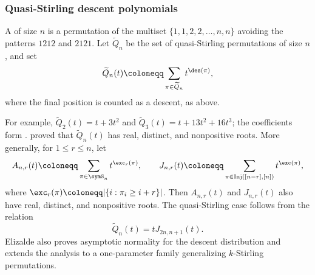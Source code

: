 \subsubsection[quasiStirlingDescentRealRooted]{Quasi-Stirling descent polynomials}

\begin{example*}
A \label{quasiStirlingPermutation}
of size $n$ is a permutation of the multiset
$\{1,1,2,2,\dotsc,n,n\}$ avoiding the patterns $1212$ and $2121$.
Let $\widetilde{Q}_n$ be the set of quasi-Stirling permutations of size $n$,
and set
\[
 \widetilde{Q}_n(t) \coloneqq \sum_{\pi \in \widetilde{Q}_n} t^{\des(\pi)},
\]
where the final position is counted as a descent, as above.

For example, $\widetilde{Q}_2(t)=t+3t^2$ and
$\widetilde{Q}_3(t)=t+13t^2+16t^3$; the coefficients form .
 \cite[Thm.~3.2]{Elizalde2021} proved that
$\widetilde{Q}_n(t)$ has real, distinct, and nonpositive roots.
More generally, for $1 \leq r \leq n$, let
\[
 A_{n,r}(t) \coloneqq \sum_{\pi \in \symS_n} t^{\exc_r(\pi)}, \qquad
 J_{n,r}(t) \coloneqq \sum_{\pi \in \operatorname{Inj}([n-r],[n])} t^{\exc(\pi)},
\]
where $\exc_r(\pi) \coloneqq |\{i:\pi_i \geq i+r\}|$.
Then $A_{n,r}(t)$ and $J_{n,r}(t)$ also have real, distinct, and nonpositive
roots.
The quasi-Stirling case follows from the relation
\[
 \widetilde{Q}_n(t)=t J_{2n,n+1}(t).
\]
Elizalde also proves asymptotic normality for the descent distribution and
extends the analysis to a one-parameter family generalizing
\(k\)-Stirling permutations.
\end{example*}
